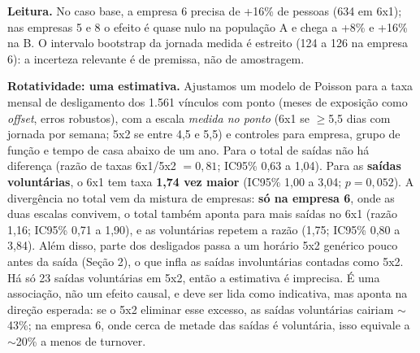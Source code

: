 \documentclass[11pt,a4paper]{article}
\begin{document}
\begin{table}[htbp]
\centering\small
{}
\caption{Integrantes a mais por empresa com a mudança para 5x2 (no cenário de carga semanal mantida, o adicional é zero em todas). Intervalo bootstrap da jornada medida na empresa 6, caso base: 123,8 a 125,5.}
\end{table}

\textbf{Leitura.} No caso base, a empresa 6 precisa de +16\% de pessoas (634 em 6x1); nas empresas 5 e 8 o efeito é quase nulo na população A e chega a +8\% e +16\% na B. O intervalo bootstrap da jornada medida é estreito (124 a 126 na empresa 6): a incerteza relevante é de premissa, não de amostragem.

\textbf{Rotatividade: uma estimativa.} Ajustamos um modelo de Poisson para a taxa mensal de desligamento dos 1.561 vínculos com ponto (meses de exposição como \emph{offset}, erros robustos), com a escala \emph{medida no ponto} (6x1 se $\ge$5,5 dias com jornada por semana; 5x2 se entre 4,5 e 5,5) e controles para empresa, grupo de função e tempo de casa abaixo de um ano. Para o total de saídas não há diferença (razão de taxas 6x1/5x2 $=0{,}81$; IC95\% 0,63 a 1,04). Para as \textbf{saídas voluntárias}, o 6x1 tem taxa \textbf{1,74 vez maior} (IC95\% 1,00 a 3,04; $p=0{,}052$). A divergência no total vem da mistura de empresas: \textbf{só na empresa 6}, onde as duas escalas convivem, o total também aponta para mais saídas no 6x1 (razão 1,16; IC95\% 0,71 a 1,90), e as voluntárias repetem a razão (1,75; IC95\% 0,80 a 3,84). Além disso, parte dos desligados passa a um horário 5x2 genérico pouco antes da saída (Seção 2), o que infla as saídas involuntárias contadas como 5x2. Há só 23 saídas voluntárias em 5x2, então a estimativa é imprecisa. É uma associação, não um efeito causal, e deve ser lida como indicativa, mas aponta na direção esperada: se o 5x2 eliminar esse excesso, as saídas voluntárias cairiam $\sim$43\%; na empresa 6, onde cerca de metade das saídas é voluntária, isso equivale a $\sim$20\% a menos de turnover.
\end{document}
